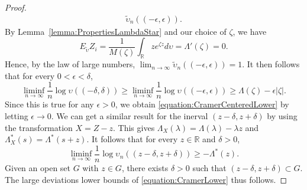\begin{proof}
\begin{equation*}
\begin{split}
\tilde{\upsilon}_n ((- \epsilon, \epsilon)) .
\end{split}
\end{equation*}
By Lemma~\ref{lemma:PropertiesLambdaStar} and our choice of $\zeta$, we have
\begin{equation*}
E_{\tilde{\upsilon}} Z_i = \frac{1}{M(\zeta)} \int_{\mathbb{R}} z e^{\zeta z} d\upsilon
= \Lambda'(\zeta) = 0 .
\end{equation*}
Hence, by the law of large numbers, $\lim_{n \rightarrow \infty} \tilde{\upsilon}_n ((- \epsilon, \epsilon)) = 1$.
It then follows that for every $0 < \epsilon < \delta$,
\begin{equation*}
\liminf_{n \rightarrow \infty} \frac{1}{n} \log \upsilon ((- \delta, \delta))
\geq \liminf_{n \rightarrow \infty} \frac{1}{n} \log \upsilon ((- \epsilon, \epsilon))
\ge \Lambda (\zeta) - \epsilon | \zeta | .
\end{equation*}
Since this is true for any $\epsilon > 0$, we obtain \eqref{equation:CramerCenteredLower} by letting $\epsilon \rightarrow 0$.
We can get a similar result for the inerval $(z - \delta, z + \delta)$ by using the transformation $X = Z - z$.
This gives $\Lambda_X (\lambda) = \Lambda(\lambda) - \lambda z$ and $\Lambda_X^* (s) = \Lambda^*(s+z)$.
It follows that for every $z \in \mathbb{R}$ and $\delta > 0$,
\begin{equation*}
\liminf_{n \rightarrow \infty} \frac{1}{n} \log \upsilon_n (( z - \delta, z + \delta))
\geq - \Lambda^* (z) .
\end{equation*}
Given an open set $G$ with $z \in G$, there exists $\delta > 0$ such that $(z - \delta, z + \delta  ) \subset G$.
The large deviations lower bounds of \eqref{equation:CramerLower} thus follows.


\end{proof}
